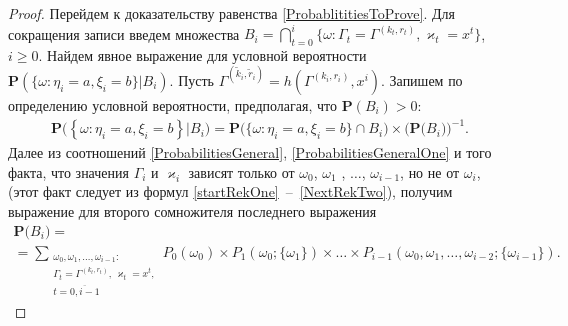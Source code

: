 \documentclass[12pt]{extarticle}
\theoremstyle{theorem}
\theoremstyle{remark}
\renewcommand{\Pr}{{\mathbf P}}
\begin{document}
\begin{proof}
Перейдем к доказательству равенства \eqref{ProbablititiesToProve}. Для сокращения записи введем множества $B_i = \bigcap_{t=0}^{i}\{\omega\colon \Gamma_t=\Gamma^{(k_t,r_t)}, \varkappa_t=x^t\}$, $i\geqslant 0$. Найдем явное выражение для условной вероятности $\Pr (\{ \omega \colon \eta_i = a, \xi_i=b\} | B_i)$. Пусть $\Gamma^{(\tilde{k}_i,\tilde{r}_i)}=h(\Gamma^{(k_i,r_i)},x^i)$. Запишем по определению условной вероятности, предполагая, что $\Pr(B_i)>0$:
\begin{multline}
\Pr \bigl(\left\{ \omega \colon \eta_i = a, \xi_i=b\right\}  |B_i\bigr) 
=\Pr\bigl(\{ \omega \colon \eta_i = a, \xi_i=b \} \cap B_i\bigr) 
\times
\bigl(\Pr\bigl( B_i\bigr)\bigr)^{-1}.
\label{Construction:1}
\end{multline}
Далее из соотношений \eqref{ProbabilitiesGeneral}, \eqref{ProbabilitiesGeneralOne} и того факта, что значения $\Gamma_i$ и $\varkappa_{i}$ зависят только от $\omega_0$, $\omega_1$ , $\ldots$, $\omega_{i-1}$, но не от $\omega_i$, (этот факт следует из формул \eqref{startRekOne}~--~\eqref{NextRekTwo}), получим выражение для второго сомножителя последнего выражения
\begin{multline}
\Pr\bigl( B_i\bigr)=\\
=\sum_{\substack{\omega_0, \omega_1,\ldots, \omega_{i-1} \colon \\ \Gamma_t=\Gamma^{(k_t,r_t)},\, \varkappa_t=x^t,\\ t=\overline{0,i-1}}} P_0(\omega_0)\times P_1(\omega_0;\{\omega_1\})\times\ldots\times P_{i-1}(\omega_0,\omega_1,\ldots, \omega_{i-2};\{\omega_{i-1}\}).
\label{Construction:2}
\end{multline}


\end{proof}
\end{document}
